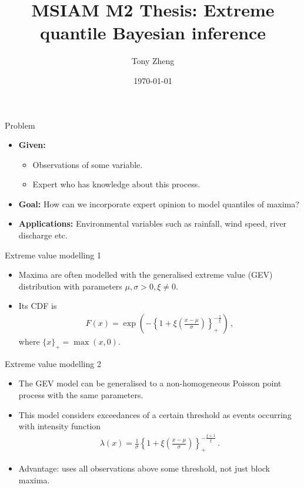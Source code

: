 \documentclass[10pt]{beamer}
\title[%
	MSIAM M2 Thesis: Extreme quantile Bayesian estimators]
{%
	\textbf{MSIAM M2 Thesis: Extreme quantile Bayesian inference}}
\subtitle[]{}
\author[Tony Zheng]{Tony Zheng}
\institute[]{}
\date{\today}
\begin{document}
%
{\1\begin{frame}\titlepage\end{frame}}
%
%
\begin{frame}{Problem}{}
%
\begin{itemize}
	\item[] \textbf{Given:}
		\begin{itemize}
			\item Observations of some variable.
			\item Expert who has knowledge about this process.
		\end{itemize}
	\item[] \textbf{Goal:} How can we incorporate expert opinion
		to model quantiles of maxima?
	\item[] \textbf{Applications:} Environmental variables such as
	rainfall, wind speed, river discharge etc.
\end{itemize}
%
\end{frame}
%
%
\begin{frame}{Extreme value modelling 1}{}
%
\begin{itemize}
	\item Maxima are often modelled with the
		generalised extreme value (GEV)
		distribution with parameters $\mu, \sigma > 0, \xi \neq 0$.
	\item Its CDF is
		\begin{align*}
			F(x) =
				\exp\left(-\left\{1 + \xi
				\left(\frac{x - \mu}{\sigma}\right)\right\}_+
				^ {-\frac{1}{\xi}}\right) \,,
		\end{align*}
		where $\{x\}_+ = \max(x, 0)$.
\end{itemize}
%
\end{frame}
%
%
\begin{frame}{Extreme value modelling 2}{}
%
\begin{itemize}
	\item The GEV model can be generalised to a
		non-homogeneous Poisson point process
		with the same parameters.
	\item This model considers exceedances of a certain threshold as events
		occurring with intensity function
		\begin{align*}
			\lambda(x) =
			\frac{1}{\sigma}
				\left\{1 + \xi \left(\frac{x - \mu}{\sigma}\right)\right\}_+
				^ {-\frac{\xi + 1}{\xi}} \,.
		\end{align*}
	\item Advantage: uses all observations above some threshold,
		not just block maxima.
\end{itemize}
%
\end{frame}
\end{document}
